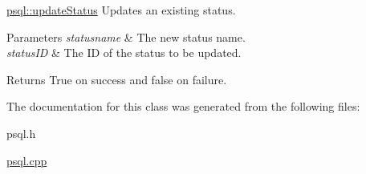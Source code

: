 \mbox{\hyperlink{classpsql_a620364c99c98e20720908deb045536a0}{psql\+::update\+Status}} Updates an existing status. 


\begin{DoxyParams}{Parameters}
{\em statusname} & The new status name. \\
\hline
{\em status\+ID} & The ID of the status to be updated. \\
\hline
\end{DoxyParams}
\begin{DoxyReturn}{Returns}
True on success and false on failure. 
\end{DoxyReturn}


The documentation for this class was generated from the following files\+:\begin{DoxyCompactItemize}
\item 
psql.\+h\item 
\mbox{\hyperlink{psql_8cpp}{psql.\+cpp}}\end{DoxyCompactItemize}
